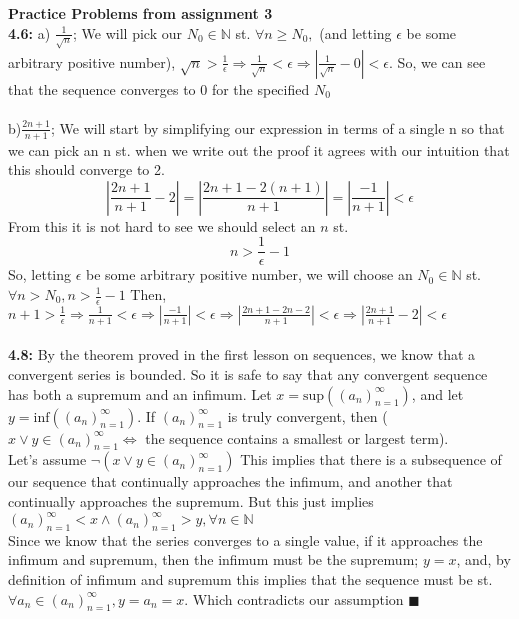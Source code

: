 \documentclass[11pt]{article}
\begin{document}
    \textbf{Practice Problems from assignment 3}\\
    \textbf{4.6:}
    a) $\frac{1}{\sqrt{n}}$; We will pick our $N_0 \in \mathbb{N}$ st. $\forall n \ge N_0,$
    (and letting $\epsilon$ be some arbitrary positive number),
    $\sqrt{n} > \frac{1}{\epsilon} \Rightarrow \frac{1}{\sqrt{n}} < \epsilon
    \Rightarrow |\frac{1}{\sqrt{n}} -0 | < \epsilon$.
    So, we can see that the sequence converges to 0 for the specified $N_0$\\\\
    b)$\frac{2n + 1}{n+1}$; We will start by simplifying our expression in terms of a
    single n so that we can pick an n st. when we write out the proof it agrees with our intuition that
    this should converge to 2.
    \[|\frac{2n + 1}{n+1} - 2| = |\frac{2n+1 -2(n+1)}{n+1}|=|\frac{-1}{n+1}|<\epsilon\]
    From this it is not hard to see we should select an $n$ st.
    \[n > \frac{1}{\epsilon} - 1\]
    So, letting $\epsilon$ be some arbitrary positive number, we will choose an $N_0 \in \mathbb{N}$ st. $\forall n > N_0, n > \frac{1}{\epsilon} - 1$
    Then, $n+1 > \frac{1}{\epsilon} \Rightarrow \frac{1}{n+1} < \epsilon \Rightarrow |\frac{-1}{n+1}|<\epsilon \Rightarrow |\frac{2n+ 1 - 2n -2}{n+1}| < \epsilon \Rightarrow |\frac{2n+1}{n+1} - 2| < \epsilon$
    \\\\
    \textbf{4.8:}  By the theorem proved in the first lesson on sequences, we know that a convergent series is bounded. So it is safe to say that any convergent sequence has both a supremum and an infimum.
    Let $x = \text{sup}((a_n)^\infty_{n=1})$, and let $y = \text{inf}((a_n)^\infty_{n=1})$.
    If $(a_n)^\infty_{n=1}$ is truly convergent, then ($x \lor y \in (a_n)^\infty_{n=1} \Leftrightarrow$
    the sequence contains a smallest or largest term).\\
    Let's assume $\neg(x \lor y \in (a_n)^\infty_{n=1})$ This implies that there is a subsequence of our sequence that continually approaches the infimum,
    and another that continually approaches the supremum. But this just implies
    $(a_n)^\infty_{n=1} < x \land (a_n)^\infty_{n=1} > y, \forall n \in \mathbb{N}$
    \\Since we know that the series converges to a single value, if it approaches the infimum and supremum,
    then the infimum must be the supremum; $y=x$,
    and, by definition of infimum and supremum
    this implies that the sequence must be st. $\forall a_n \in (a_n)^\infty_{n=1}, y = a_n = x$. Which contradicts our assumption $\blacksquare$
\end{document}
